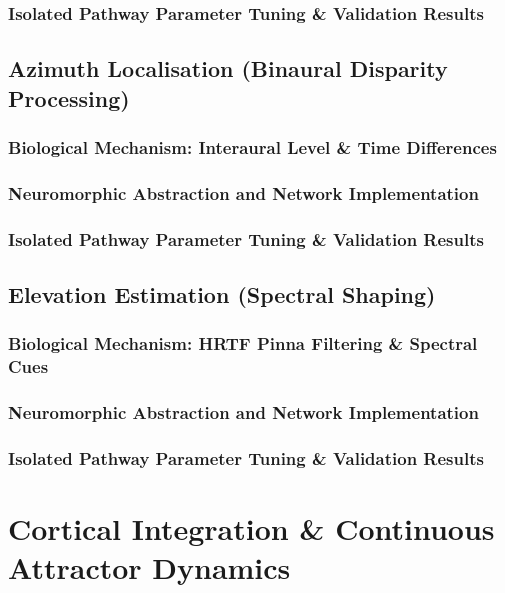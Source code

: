 \documentclass[12pt,a4paper]{report}
\begin{document}
    \subsection{Isolated Pathway Parameter Tuning \& Validation Results}

\section{Azimuth Localisation (Binaural Disparity Processing)}
    \subsection{Biological Mechanism: Interaural Level \& Time Differences}
    \subsection{Neuromorphic Abstraction and Network Implementation}
    \subsection{Isolated Pathway Parameter Tuning \& Validation Results}

\section{Elevation Estimation (Spectral Shaping)}
    \subsection{Biological Mechanism: HRTF Pinna Filtering \& Spectral Cues}
    \subsection{Neuromorphic Abstraction and Network Implementation}
    \subsection{Isolated Pathway Parameter Tuning \& Validation Results}

\chapter{Cortical Integration \& Continuous Attractor Dynamics}
\label{ch:cortical}
\end{document}
